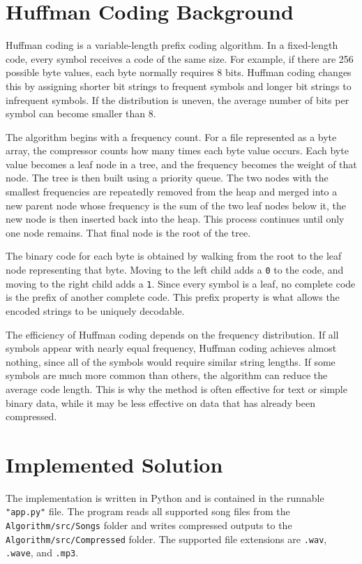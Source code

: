\documentclass[11pt,a4paper]{article}
\begin{document}
\section{Huffman Coding Background}

Huffman coding is a variable-length prefix coding algorithm. In a fixed-length
code, every symbol receives a code of the same size. For example, if there are
256 possible byte values, each byte normally requires 8 bits. Huffman coding
changes this by assigning shorter bit strings to frequent symbols and longer bit
strings to infrequent symbols. If the distribution is uneven, the average number
of bits per symbol can become smaller than 8.

The algorithm begins with a frequency count. For a file represented as a byte
array, the compressor counts how many times each byte value occurs. Each byte
value becomes a leaf node in a tree, and the frequency becomes the weight of
that node. The tree is then built using a priority queue. The two nodes with the smallest frequencies are repeatedly removed
from the heap and merged into a new parent node whose frequency is the sum of
the two leaf nodes below it, the new node is then inserted back into the heap. This process
continues until only one node remains. That final node is the root of the tree.

The binary code for each byte is obtained by walking from the root to the leaf
node representing that byte. Moving to the left child adds a \texttt{0} to the
code, and moving to the right child adds a \texttt{1}. Since every symbol is a
leaf, no complete code is the prefix of another complete code. This prefix
property is what allows the encoded strings to be uniquely decodable.

The efficiency of Huffman coding depends on the frequency distribution. If all
symbols appear with nearly equal frequency, Huffman coding achieves almost nothing, since all of the symbols would require similar string lengths. If some symbols
are much more common than others, the algorithm can reduce the average code
length. This is why the method is often effective for text or simple binary
data, while it may be less effective on data that has already been compressed.

\section{Implemented Solution}

The implementation is written in Python and is contained in the runnable \texttt{"app.py"} file. The program reads all supported song files from the
\texttt{Algorithm/src/Songs} folder and writes compressed outputs to the
\texttt{Algorithm/src/Compressed} folder. The supported file extensions are
\texttt{.wav}, \texttt{.wave}, and \texttt{.mp3}.
\end{document}

